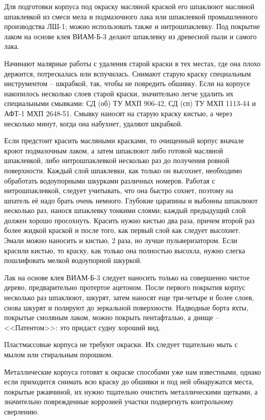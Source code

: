 \documentclass[a4paper, 12pt, twoside, final]{scrbook}
\begin{document}
Для подготовки корпуса под окраску масляной краской его шпаклюют масляной шпаклевкой из смеси мела и подмазочного лака или шпаклевкой промышленного производства ЛШ-1; можно использовать также и нитрошпаклевку. Под покрытие лаком на основе клея ВИАМ-Б-3 делают шпаклевку из древесной пыли и самого лака.

Начинают малярные работы с удаления старой краски в тех местах, где она плохо держится, потрескалась или вспучилась. Снимают старую краску специальным инструментом \--- шкрабкой, так, чтобы не повредить обшивку. Если на корпусе накопилось несколько слоев старой краски, значительно легче удалить их специальными смывками: СД (об) ТУ МХП 906-42, СД (сп) ТУ МХП 1113-44 и АФТ-1 МХП 2648-51. Смывку наносят на старую краску кистью, а через несколько минут, когда она набухнет, удаляют шкрабкой.

Если предстоит красить масляными красками, то очищенный корпус вначале кроют подмазочным лаком, а затем шпаклюют либо готовой масляной шпаклевкой, либо нитрошпаклевкой несколько раз до получения ровной поверхности. Каждый слой шпаклевки, как только он высохнет, необходимо обработать водоупорными шкурками различных номеров. Работая с нитрошпаклевкой, следует учитывать, что она быстро сохнет, поэтому на шпатель её надо брать очень немного. Глубокие царапины и выбоины шпаклюют несколько раз, нанося шпаклевку тонкими слоями; каждый предыдущий слой должен хорошо просохнуть. Красить нужно кистью два раза, причем второй раз более жидкой краской и после того, как первый слой как следует высохнет. Эмали можно наносить и кистью, 2 раза, но лучше пульверизатором. Если красили кистью, то краску, как только она полностью высохла, нужно слегка пошлифовать мелкой водоупорной шкуркой.

Лак на основе клея ВИАМ-Б-3 следует наносить только на совершенно чистое дерево, предварительно протертое ацетоном. После первого покрытия корпус несколько раз шпаклюют, шкурят, затем наносят еще три-четыре и более слоев, снова шкурят и полируют до зеркальной поверхности. Надводные борта яхты, покрытые смоляным лаком, можно покрыть пентафталью, а днище \--- <<Патентом>>: это придаст судну хороший вид.

Пластмассовые корпуса не требуют окраски. Их следует тщательно мыть с мылом или стиральным порошком.

Металлические корпуса готовят к окраске способами уже нам известными, однако если приходится снимать всю краску до обшивки и под ней обнаружатся места, покрытые ржавчиной, их нужно тщательно очистить металлическими щетками, а значительно поврежденные коррозией участки подвергнуть контрольному сверлению.
\end{document}
